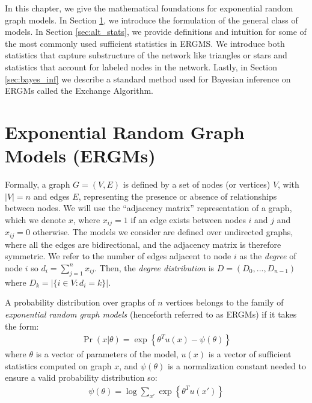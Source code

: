 In this chapter, we give the mathematical foundations for exponential random graph models. In Section \ref{sec:ergms}, we introduce the formulation of the general class of models. In Section \ref{sec:alt_stats}, we provide definitions and intuition for some of the most commonly used sufficient statistics in ERGMS. We introduce both statistics that capture substructure of the network like triangles or stars and statistics that account for labeled nodes in the network. Lastly, in Section \ref{sec:bayes_inf} we describe a standard method used for Bayesian inference  on ERGMs called the Exchange Algorithm.

\section{Exponential Random Graph Models (ERGMs)}\label{sec:ergms}

Formally, a graph $G = (V,E)$ is defined by a set of nodes (or vertices) $V$, with $|V| = n$ and edges $E$, representing the presence or absence of relationships between nodes. We will use the ``adjacency matrix'' representation of a graph, which we denote $x$, where $x_{ij} = 1$ if an edge exists between nodes $i$ and $j$ and $x_{ij} = 0$ otherwise.  The models we consider are defined over undirected graphs, where all the edges are bidirectional, and the adjacency matrix is therefore symmetric. We refer to the number of edges adjacent to node $i$ as the \emph{degree} of node $i$ so $d_i = \sum_{j=1}^{n} x_{ij}$. Then, the \emph{degree distribution} is $D = (D_0,...,D_{n-1})$ where $D_k = |\{i \in V : d_i = k \}|$.

\begin{definition}
\label{def:ergm_defn}
A probability distribution over graphs of $n$ vertices belongs to the family of \emph{exponential random graph models} (henceforth referred to as ERGMs) if it takes the form:
\begin{align*}
\Pr(x | \theta) = \exp\left\{\theta^T u(x) - \psi(\theta)  \right\}
\end{align*}
where $\theta$ is a vector of parameters of the model, $u(x)$ is a vector of sufficient statistics computed on graph $x$, and $\psi(\theta)$ is a normalization constant needed to ensure a valid probability distribution so:
\begin{align*}
\psi(\theta) = \log \sum_{x'} \exp\left\{\theta^T u(x') \right\}
\end{align*}
\end{definition}

